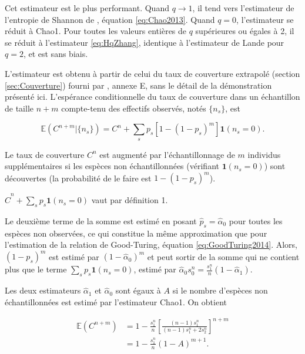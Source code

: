 \documentclass[
  11pt,
  french,
  a4paper,
  extrafontsizes,onecolumn,openright
  ]{memoir}
\newlength{\rf}
\begin{document}
Cet estimateur est le plus performant. Quand \(q \to 1\), il tend vers l'estimateur de l'entropie de Shannon de \textcite{Chao2013}, équation \eqref{eq:Chao2013}.
Quand \(q=0\), l'estimateur se réduit à Chao1. Pour toutes les valeurs entières de \(q\) supérieures ou égales à 2, il se réduit à l'estimateur \eqref{eq:HqZhang}, identique à l'estimateur de Lande pour \(q=2\), et est sans biais.

L'estimateur est obtenu à partir de celui du taux de couverture extrapolé (section \ref{sec:Couverture}) fourni par \textcite{Chao2012b}, annexe E, sans le détail de la démonstration présenté ici.
L'espérance conditionnelle du taux de couverture dans un échantillon de taille \(n+m\) compte-tenu des effectifs observés, notés \(\{n_s\}\), est

\begin{equation}
  \label{eq:EspCnm}
  {\mathbb E}\left(C^{n+m} | \{n_s\} \right)
  = C^{n} + \sum_s{p_s [1-(1-p_s)^m] \mathbf{1}(n_s=0)}.
\end{equation}

Le taux de couverture \(C^{n}\) est augmenté par l'échantillonnage de \(m\) individus supplémentaires si les espèces non échantillonnées (vérifiant \(\mathbf{1}(n_s=0)\)) sont découvertes (la probabilité de le faire est \(1-(1-p_s)^m\)).

\(\hat{C}^{n} + \sum_s{p_s \mathbf{1}(n_s=0)}\) vaut par définition 1.

Le deuxième terme de la somme est estimé en posant \(\hat{p}_s = \hat{\alpha}_0\) pour toutes les espèces non observées, ce qui constitue la même approximation que pour l'estimation de la relation de Good-Turing, équation \eqref{eq:GoodTuring2014}.
Alors, \((1-p_s)^m\) est estimé par \((1-\hat{\alpha}_0)^m\) et peut sortir de la somme qui ne contient plus que le terme \(\sum_s{p_s}\mathbf{1}(n_s=0)\), estimé par \(\hat{\alpha}_0 {s^{n}_{0}} = \frac{s^{n}_{1}}{n}(1 - \hat{\alpha}_1)\).

Les deux estimateurs \(\hat{\alpha}_1\) et \(\hat{\alpha}_0\) sont égaux à \(A\) si le nombre d'espèces non échantillonnées est estimé par l'estimateur Chao1.
On obtient

\begin{align} 
  \label{eq:Cnm}
  {\mathbb E}\left(C^{n+m} \right)
  &= 1-\frac{s^{n}_{1}}{n} 
    \left[ \frac{\left(n-1\right)s^{n}_{1}}{\left(n-1\right)s^{n}_{1}+2s^{n}_{2}} \right]^{n+m} \\
  &= 1-\frac{s^{n}_{1}}{n} \left( 1-A \right)^{m+1}.
\end{align}
\end{document}
